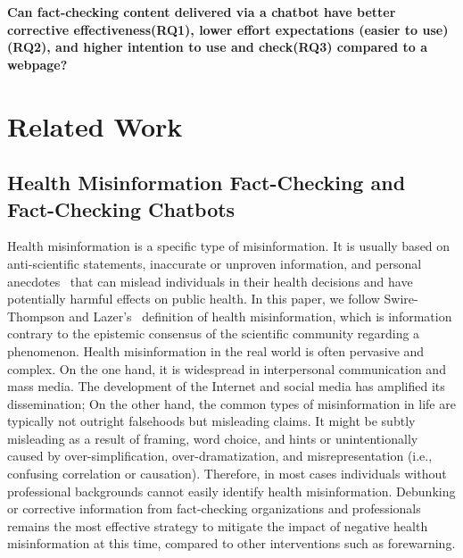 \textbf{Can fact-checking content delivered via a chatbot have better corrective effectiveness(RQ1), lower effort expectations (easier to use) (RQ2), and higher intention to use and check(RQ3) compared to a webpage?}
\section{Related Work}
\subsection{Health Misinformation Fact-Checking and Fact-Checking Chatbots}
Health misinformation is a specific type of misinformation. It is usually based on anti-scientific statements, inaccurate or unproven
information, and personal anecdotes~\cite[]{teoh2019power,qi2016misinformation}  that can mislead individuals in their health decisions and have potentially harmful effects on public health.
In this paper, we follow Swire-Thompson and Lazer's~\cite[]{swire2019public} definition of health misinformation, which is information contrary to the epistemic consensus of the scientific community regarding a phenomenon.
Health misinformation in the real world is often pervasive and complex. 
On the one hand, it is widespread in interpersonal communication\cite[]{difonzo2012rumors} and mass media\cite[]{southwell2015prevalence}.
The development of the Internet and social media has amplified its dissemination\cite[]{southwell2015prevalence}; 
On the other hand, the common types of misinformation in life are typically not outright falsehoods but misleading claims\cite[]{al2018drug}. It might be subtly misleading as a result of framing, word choice, and hints\cite[]{ecker2014effects} or unintentionally caused by over-simplification, over-dramatization, and misrepresentation (i.e., confusing correlation or causation)\cite[]{lewandowsky2012misinformation}.
Therefore, in most cases individuals without professional backgrounds cannot easily identify health misinformation.
Debunking or corrective information from fact-checking organizations and professionals remains the most effective strategy to mitigate the impact of negative health misinformation at this time, compared to other interventions such as forewarning\cite[]{walter2018unring,walter2020meta,porter2021global}.


